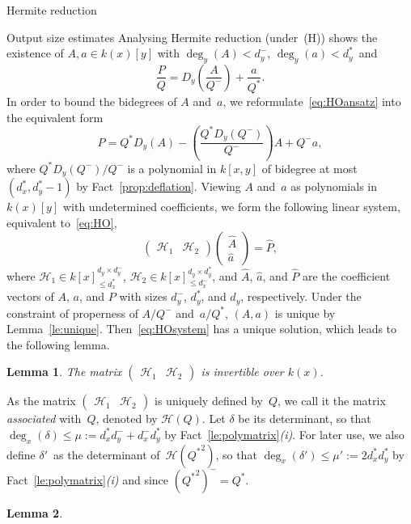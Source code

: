 \documentclass{sig-alt-full}
\newcommand{\HO}{\mathcal H}
\newtheorem{lemma}{Lemma}
\begin{document}
\begin{section}{Hermite reduction}
\begin{subsection}{Output size estimates}
Analysing Hermite reduction (under~(H))
shows the existence of $A,a \in k(x)[y]$
with $\deg_y(A)<d_y^-$, $\deg_y(a)<d_y^*$~and
\begin{equation}\label{eq:HOansatz}
\frac{P}{Q} = D_y\left(\frac{A}{Q^-}\right) + \frac{a}{Q^*}.
\end{equation}
In order to bound the bidegrees of $A$ and~$a$, we
reformulate~\eqref{eq:HOansatz} into the equivalent form
\begin{equation}\label{eq:HO}
P = Q^* D_y(A)-\left(\frac{Q^*D_y({Q^-})}{Q^-}\right) A + Q^- a,
\end{equation}
where $Q^*D_y(Q^-)/Q^-$ is a polynomial in $k[x, y]$ of bidegree at most $(d_x^*, d_y^*-1)$ by Fact~\ref{prop:deflation}.
Viewing $A$ and~$a$ as polynomials in $k(x)[y]$ with undetermined
coefficients, we form the following linear system, equivalent to~\eqref{eq:HO},
\begin{equation}\label{eq:HOsystem}
\begin{pmatrix}\HO_1&\HO_2\end{pmatrix}
\begin{pmatrix}\hat{A}\\\hat{a}\end{pmatrix} = \hat{P},
\end{equation}
where $\HO_1\in k[x]^{d_y \times d_y^-}_{\le d_x^*}$, $\HO_2\in
k[x]^{d_y \times d_y^*}_{\le d_x^-}$, and $\hat A$, $\hat a$, and
$\hat P$ are the coefficient vectors of $A$, $a$, and $P$ with sizes
$d_y^-$, $d_y^*$, and $d_y$, respectively.
Under the constraint of properness of $A/Q^-$ and~$a/Q^*$, $(A,a)$ is
unique by Lemma~\ref{le:unique}.
Then~\eqref{eq:HOsystem} has a unique solution, which leads to
the following lemma.
\begin{lemma}\label{le:HOsystem}
The matrix $\begin{pmatrix}\HO_1&\HO_2\end{pmatrix}$ is invertible over $k(x)$.
\end{lemma}
As the matrix $\begin{pmatrix}\HO_1&\HO_2\end{pmatrix}$ is
uniquely defined by~$Q$, we call it the matrix \emph{associated\/}
with~$Q$, denoted by $\HO(Q)$. Let $\delta$ be its determinant, so
that $\deg_x(\delta)\leq \mu:=d_x^*d_y^-+d_x^-d_y^*$ by
Fact~\ref{le:polymatrix}\emph{(i)}.
For later use, we also define $\delta'$~as the determinant
of~$\HO({Q^*}^2)$, so that $\deg_x(\delta')\leq \mu':=2d_x^*d_y^*$ by
Fact~\ref{le:polymatrix}\emph{(i)} and since $({Q^*}^2)^-=Q^*$.
\begin{lemma} \label{le:HRsize}

\end{lemma}
\end{subsection}
\end{section}
\end{document}
